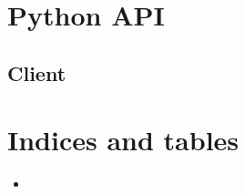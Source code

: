 \documentclass[letterpaper,10pt,english]{sphinxmanual}
\begin{document}
\chapter{Python API}
\label{\detokenize{python_api:python-api}}\label{\detokenize{python_api::doc}}

\section{Client}
\label{\detokenize{python_api:client}}

\chapter{Indices and tables}
\label{\detokenize{index:indices-and-tables}}\begin{itemize}
\item {} 

\end{itemize}



\renewcommand{\indexname}{Index}
\printindex
\end{document}
